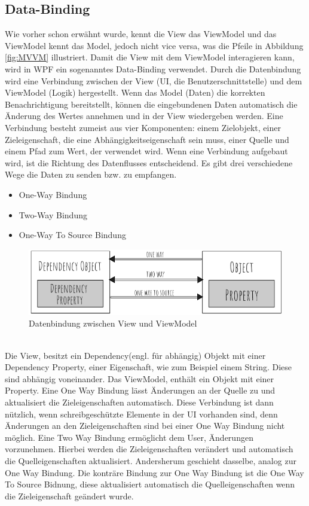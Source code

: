 \subsection*{Data-Binding}
Wie vorher schon erw\"ahnt wurde, kennt die View das ViewModel und das ViewModel kennt das Model, jedoch nicht vice versa, was die Pfeile in Abbildung \ref{fig:MVVM} illustriert.
Damit die View mit dem ViewModel interagieren kann, wird in WPF ein sogenanntes Data-Binding verwendet.
Durch die Datenbindung wird eine Verbindung zwischen der View (\ac{UI}, die Benutzerschnittstelle) und dem ViewModel (Logik) hergestellt. Wenn das Model (Daten) die korrekten Benachrichtigung bereitstellt, k\"onnen die eingebundenen Daten automatisch die \"Anderung des Wertes annehmen und in der View wiedergeben werden\cite{Cai2017}.
Eine Verbindung besteht zumeist aus vier Komponenten: einem Zielobjekt, einer Zieleigenschaft, die eine Abh\"angigkeitseigenschaft sein muss, einer Quelle und einem Pfad zum Wert, der verwendet wird. 
Wenn eine Verbindung aufgebaut wird, ist die Richtung des Datenflusses entscheidend. Es gibt drei verschiedene Wege die Daten zu senden bzw. zu empfangen.
\begin{itemize}
\item One-Way Bindung
\item Two-Way Bindung
\item One-Way To Source Bindung
\end{itemize}
\begin{figure}[h] 
\centering
\includegraphics[scale=0.55]{fig/Data-Binding.png} 
\caption{Datenbindung zwischen View und ViewModel\footnotemark}
\label{fig:DataBinding}
\end{figure} 
\\
Die View, besitzt ein Dependency(engl. f\"ur abh\"angig) Objekt mit einer Dependency Property, einer Eigenschaft, wie zum Beispiel einem String. Diese sind abh\"angig voneinander. Das ViewModel, enth\"alt ein Objekt mit einer Property. Eine One Way Bindung l\"asst \"Anderungen an der Quelle zu und aktualisiert die Zieleigenschaften automatisch. Diese Verbindung ist dann n\"utzlich, wenn schreibgesch\"utzte Elemente in der \ac{UI} vorhanden sind, denn \"Anderungen an den Zieleigenschaften sind bei einer One Way Bindung nicht m\"oglich.
Eine Two Way Bindung erm\"oglicht dem User, \"Anderungen vorzunehmen. Hierbei werden die Zieleigenschaften ver\"andert und automatisch die Quelleigenschaften aktualisiert. Andersherum geschieht dasselbe, analog zur One Way Bindung. Die kontr\"are Bindung zur One Way Bindung ist die One Way To Source Bidnung, diese aktualisiert automatisch die Quelleigenschaften wenn die Zieleigenschaft ge\"andert wurde.
